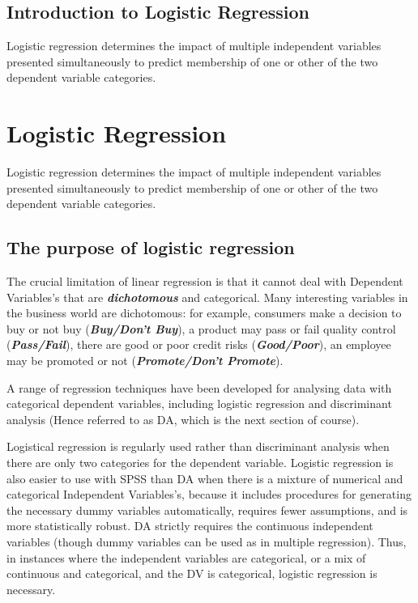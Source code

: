 ﻿\documentclass[a4paper,12pt]{article}
\begin{document}
\subsection{Introduction to Logistic Regression}
Logistic regression determines the impact of multiple independent variables
presented simultaneously to predict membership of one or other of the two
dependent variable categories.


\newpage
\section{Logistic Regression}
Logistic regression determines the impact of multiple independent variables
presented simultaneously to predict membership of one or other of the two
dependent variable categories.

\subsection{The purpose of logistic regression}
The crucial limitation of linear regression is that it cannot deal with Dependent Variables’s that are \textbf{\textit{dichotomous}} and categorical. Many interesting variables in the business world are dichotomous: for
example, consumers make a decision to buy or not buy (\textit{\textbf{Buy/Don't Buy}}), a product may pass or fail quality control (\textit{\textbf{Pass/Fail}}), there are good or poor credit risks (\textit{\textbf{Good/Poor}}), an employee may be promoted or not (\textit{\textbf{Promote/Don't Promote}}).


A range of regression techniques have been developed for analysing data with categorical dependent
variables, including logistic regression and discriminant analysis (Hence referred to as DA, which is the next section of course).

Logistical regression is regularly used rather than discriminant analysis when there are only two categories
for the dependent variable. Logistic regression is also easier to use with SPSS than DA when
there is a mixture of numerical and categorical Independent Variables’s, because it includes procedures for
generating the necessary dummy variables automatically, requires fewer assumptions, and
is more statistically robust. DA strictly requires the continuous independent variables  (though dummy variables can be used as in multiple regression). Thus, in instances where
the independent variables are categorical, or a mix of continuous and categorical, and the
DV is categorical, logistic regression is necessary.
\end{document}
